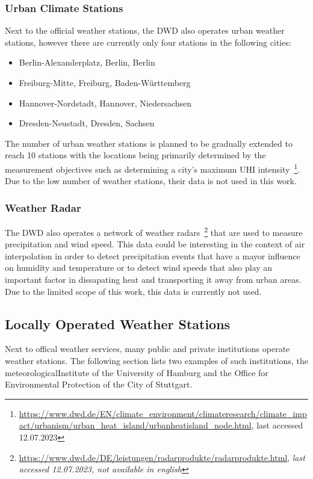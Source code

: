 \subsubsection{Urban Climate Stations}

Next to the official weather stations, the DWD also operates urban weather stations, however there are currently only four stations in the following cities:

\begin{itemize}
    \item Berlin-Alexanderplatz, Berlin, Berlin
    \item Freiburg-Mitte, Freiburg, Baden-Württemberg
    \item Hannover-Nordstadt, Hannover, Niedersachsen
    \item Dresden-Neustadt, Dresden, Sachsen
\end{itemize}

The number of urban weather stations is planned to be gradually extended to reach 10 stations with the locations being primarily determined by the measurement objectives such as determining a city's maximum UHI intensity~\footnote{\url{https://www.dwd.de/EN/climate\_environment/climateresearch/climate\_impact/urbanism/urban\_heat\_island/urbanheatisland\_node.html}, last accessed 12.07.2023}. Due to the low number of weather stations, their data is not used in this work.

\subsubsection{Weather Radar}

The DWD also operates a network of weather radars~\footnote{\url{https://www.dwd.de/DE/leistungen/radarprodukte/radarprodukte.html}, \textit{last accessed 12.07.2023, not available in english}} that are used to measure precipitation and wind speed. This data could be interesting in the context of air interpolation in order to detect precipitation events that have a mayor influence on humidity and temperature or to detect wind speeds that also play an important factor in dissapating heat and transporting it away from urban areas.
Due to the limited scope of this work, this data is currently not used.

\subsection{Locally Operated Weather Stations}

Next to offical weather services, many public and private institutions operate weather stations. The following section lists two examples of such institutions, the meteorologicalInstitute of the University of Hamburg and the Office for Environmental Protection of the City of Stuttgart.

